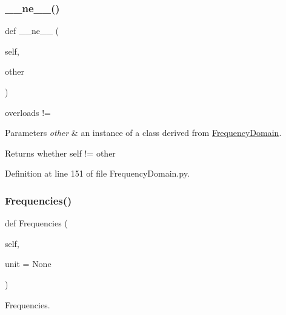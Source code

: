 \subsubsection{\texorpdfstring{\+\_\+\+\_\+ne\+\_\+\+\_\+()}{\_\_ne\_\_()}}
{\footnotesize\ttfamily def \+\_\+\+\_\+ne\+\_\+\+\_\+ (\begin{DoxyParamCaption}\item[{}]{self,  }\item[{}]{other }\end{DoxyParamCaption})}



overloads != 


\begin{DoxyParams}{Parameters}
{\em other} & an instance of a class derived from \hyperlink{classSignalIntegrity_1_1FrequencyDomain_1_1FrequencyDomain_1_1FrequencyDomain}{Frequency\+Domain}. \\
\hline
\end{DoxyParams}
\begin{DoxyReturn}{Returns}
whether self != other 
\end{DoxyReturn}


Definition at line 151 of file Frequency\+Domain.\+py.

\mbox{\label{classSignalIntegrity_1_1FrequencyDomain_1_1FrequencyDomain_1_1FrequencyDomain_a227f355ed05bff8c1061e26a8a53758a}} 
\subsubsection{\texorpdfstring{Frequencies()}{Frequencies()}}
{\footnotesize\ttfamily def Frequencies (\begin{DoxyParamCaption}\item[{}]{self,  }\item[{}]{unit = {\ttfamily None} }\end{DoxyParamCaption})}



Frequencies. 


